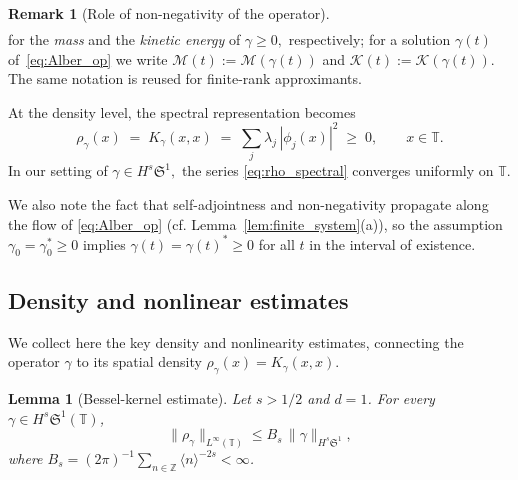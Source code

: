\documentclass[11pt]{amsart}
\newtheorem{lemma}[theorem]{Lemma}
\theoremstyle{definition}
\newtheorem{remark}[theorem]{Remark}
\newcommand{\T}{\mathbb{T}}
\newcommand{\Z}{\mathbb{Z}}
\newcommand{\Sp}{\mathfrak{S}}
\begin{document}
\begin{remark}[Role of non-negativity of the operator]
\begin{equation}
\begin{aligned}
\end{aligned}
\end{equation}
for the \emph{mass} and the \emph{kinetic energy} of $\gamma\ge 0,$ respectively; for a solution $\gamma(t)$ of~\eqref{eq:Alber_op} we write $\mathcal{M}(t):=\mathcal{M}(\gamma(t))$ and $\mathcal{K}(t):=\mathcal{K}(\gamma(t)).$ The same notation is reused for finite-rank approximants. %

At the density level, the spectral representation becomes
\begin{equation}\label{eq:rho_spectral}
  \rho_\gamma(x) \;=\; K_\gamma(x,x) \;=\; \sum_j\lambda_j\,|\phi_j(x)|^2 \;\ge\; 0,
  \qquad x\in\T.
\end{equation}
In our setting of $\gamma \in H^s\Sp^1,$ the series \eqref{eq:rho_spectral} converges  uniformly on $\T.$

We also note the fact that self-adjointness and non-negativity propagate along the flow of \eqref{eq:Alber_op} (cf. Lemma~\ref{lem:finite_system}(a)), so the assumption $\gamma_0=\gamma_0^*\ge 0$ implies $\gamma(t)=\gamma(t)^*\ge 0$ for all $t$ in the interval of existence.
\end{remark}

\subsection{Density and nonlinear estimates}\label{sec:nonlin}

We collect here the key density and nonlinearity estimates, connecting the operator $\gamma$ to its spatial density $\rho_\gamma(x)=K_\gamma(x,x)$.

\begin{lemma}[Bessel-kernel estimate]
\label{lem:Bessel}
Let $s>1/2$ and $d=1$. For every $\gamma\in H^s\Sp^1(\T)$,
\begin{equation}\label{eq:Bessel}
  \|\rho_\gamma\|_{L^\infty(\T)}
  \le B_s\,\|\gamma\|_{H^s\Sp^1},
\end{equation}
where $B_s = (2\pi)^{-1}\sum_{n\in\Z} \langle n\rangle^{-2s}<\infty$.
\end{lemma}
\end{document}

